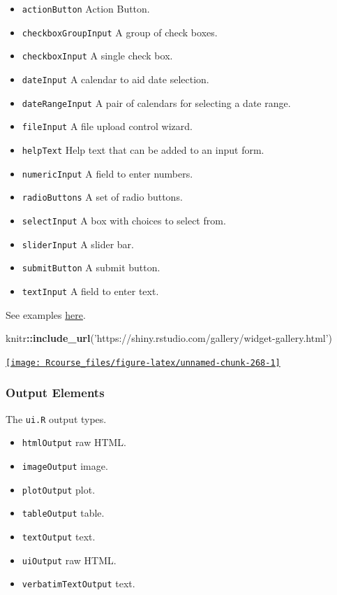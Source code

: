 \documentclass[]{book}
\newenvironment{Shaded}{\begin{snugshade}}{\end{snugshade}}
\newcommand{\KeywordTok}[1]{\textcolor[rgb]{0.13,0.29,0.53}{\textbf{#1}}}
\newcommand{\StringTok}[1]{\textcolor[rgb]{0.31,0.60,0.02}{#1}}
\newcommand{\OperatorTok}[1]{\textcolor[rgb]{0.81,0.36,0.00}{\textbf{#1}}}
\newcommand{\NormalTok}[1]{#1}
\providecommand{\tightlist}{%
  \setlength{\itemsep}{0pt}\setlength{\parskip}{0pt}}
\theoremstyle{definition}
\theoremstyle{definition}
\theoremstyle{definition}
\theoremstyle{remark}
\begin{document}
\begin{itemize}
\tightlist
\item
  \texttt{actionButton} Action Button.
\item
  \texttt{checkboxGroupInput} A group of check boxes.
\item
  \texttt{checkboxInput} A single check box.
\item
  \texttt{dateInput} A calendar to aid date selection.
\item
  \texttt{dateRangeInput} A pair of calendars for selecting a date
  range.
\item
  \texttt{fileInput} A file upload control wizard.
\item
  \texttt{helpText} Help text that can be added to an input form.
\item
  \texttt{numericInput} A field to enter numbers.
\item
  \texttt{radioButtons} A set of radio buttons.
\item
  \texttt{selectInput} A box with choices to select from.
\item
  \texttt{sliderInput} A slider bar.
\item
  \texttt{submitButton} A submit button.
\item
  \texttt{textInput} A field to enter text.
\end{itemize}

See examples
\href{https://shiny.rstudio.com/gallery/widget-gallery.html}{here}.

\begin{Shaded}
\begin{Highlighting}[]
\NormalTok{knitr}\OperatorTok{::}\KeywordTok{include_url}\NormalTok{(}\StringTok{'https://shiny.rstudio.com/gallery/widget-gallery.html'}\NormalTok{)}
\end{Highlighting}
\end{Shaded}

\href{https://shiny.rstudio.com/gallery/widget-gallery.html}{\texttt{[image: Rcourse\_files/figure-latex/unnamed-chunk-268-1]} }

\subsubsection{Output Elements}\label{output-elements}

The \texttt{ui.R} output types.

\begin{itemize}
\tightlist
\item
  \texttt{htmlOutput} raw HTML.
\item
  \texttt{imageOutput} image.
\item
  \texttt{plotOutput} plot.
\item
  \texttt{tableOutput} table.
\item
  \texttt{textOutput} text.
\item
  \texttt{uiOutput} raw HTML.
\item
  \texttt{verbatimTextOutput} text.
\end{itemize}
\end{document}
